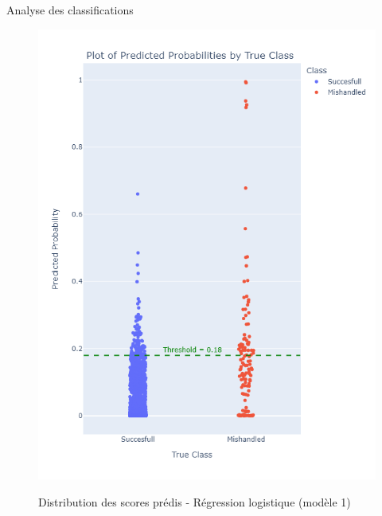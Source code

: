 \documentclass{beamer}
\begin{document}
\begin{frame}{Analyse des classifications} 
\begin{figure}
\begin{minipage}[c]{0.4\linewidth}
    \includegraphics[width=1\textwidth]{Probability_distribution_Model 1.png}\\
    \caption{Distribution des scores prédis - Régression logistique (modèle 1)}
\end{minipage}
\hfill
\begin{minipage}[c]{0.4\linewidth}

\end{minipage}
\end{figure}
\end{frame}
\end{document}
